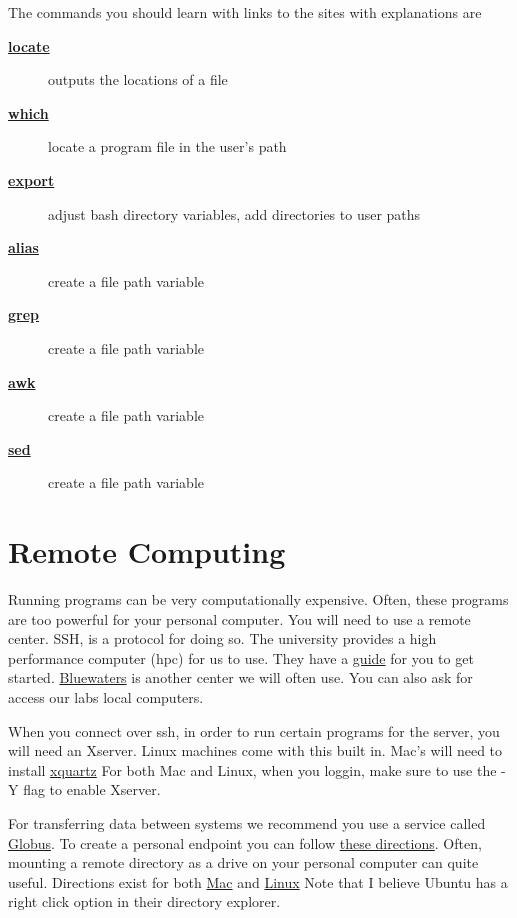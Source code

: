\documentclass{article}
\begin{document}
The commands you should learn with links to the sites with explanations are

\begin{description}
  \item[\href{http://www.cyberciti.biz/faq/search-for-files-in-bash/}{\textbf{locate}}] outputs the locations of a file
  \item[\href{http://ss64.com/bash/which.html}{\textbf{which}}] locate a program file in the user's path
  \item[\href{http://www.cyberciti.biz/faq/linux-unix-shell-export-command/}{\textbf{export}}] adjust bash directory variables, add directories to user paths
  \item[\href{http://tldp.org/LDP/abs/html/aliases.html}{\textbf{alias}}] create a file path variable
  \item[\href{http://www.panix.com/~elflord/unix/grep.html}{\textbf{grep}}] create a file path variable
  \item[\href{http://www.grymoire.com/Unix/Awk.html}{\textbf{awk}}] create a file path variable
  \item[\href{http://www.grymoire.com/Unix/Sed.html}{\textbf{sed}}] create a file path variable
\end{description}

\section*{Remote Computing}
Running programs can be very computationally expensive. 
Often, these programs are too powerful for your personal computer.
You will need to use a remote center.
SSH, is a protocol for doing so.
The university provides a high performance computer (hpc) for us to use.
They have a \href{http://wiki.hpc.ufl.edu/doc/Getting\_Started}{guide} for you to get started.
\href{http://www.ncsa.illinois.edu/enabling/bluewaters}{Bluewaters} is another center we will often use.
You can also ask for access our labs local computers.

When you connect over ssh, in order to run certain programs for the server, you will need an Xserver.
Linux machines come with this built in.
Mac's will need to install \href{http://www.xquartz.org/}{xquartz}
For both Mac and Linux, when you loggin, make sure to use the -Y flag to enable Xserver.

For transferring data between systems we recommend you use a service called \href{https://www.globus.org/researchers/getting-started}{Globus}.
To create a personal endpoint you can follow \href{https://support.globus.org/entries/23881557}{these directions}.
Often, mounting a remote directory as a drive on your personal computer can quite useful.
Directions exist for both \href{http://www.macissues.com/2014/10/13/how-to-mount-a-remote-system-as-a-drive-using-ssh-in-os-x/}{Mac} and \href{http://www.cyberciti.biz/faq/how-to-mount-remote-directory-filesystems-with-sshfs-on-linux/}{Linux}
Note that I believe Ubuntu has a right click option in their directory explorer.
\end{document}
